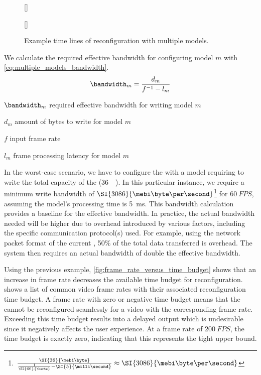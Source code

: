 \begin{figure}[hbtp]
    \centering
    [\textwidth]{
        
    }
    [\textwidth]{
        
    }
    \caption{
        Example time lines of reconfiguration with multiple models.
    }
    \label{fig:reconfig_time_line_ex}
\end{figure}

We calculate the required effective bandwidth for configuring model $m$ with \cref{eq:multiple_models_bandwidth}.
\begin{equation}
    \bandwidth_m = \frac{d_m}{f^{-1} - l_m}
    \label{eq:multiple_models_bandwidth}
\end{equation}

\begin{eqexpl}[15mm]
    \item{$\bandwidth_m$} required effective bandwidth for writing model $m$
    \item{$d_m$} amount of bytes to write for model $m$
    \item{$f$} input frame rate
    \item{$l_m$} frame processing latency for model $m$
\end{eqexpl}

In the worst-case scenario, we have to configure the \graicore{} with a model requiring to write the total capacity of the \graicore{} (\SI{36}{\mebi\byte}).
In this particular instance, we require a minimum write bandwidth of $\SI{3086}{\mebi\byte\per\second}$\footnote{$\frac{\SI{36}{\mebi\byte}}{\frac{1}{\SI{60}{\hertz}} - \SI{5}{\milli\second}} \approx \SI{3086}{\mebi\byte\per\second}$} for $\SI{60}{FPS}$, assuming the model's processing time is \SI{5}{ms}.
This bandwidth calculation provides a baseline for the effective bandwidth.
In practice, the actual bandwidth needed will be higher due to overhead introduced by various factors, including the specific communication protocol(s) used.
For example, using the network packet format of the current \confignoc{}, 50\% of the total data transferred is overhead.
The system then requires an actual bandwidth of double the effective bandwidth.

Using the previous example, \cref{fig:frame_rate_versus_time_budget} shows that an increase in frame rate decreases the available time budget for reconfiguration.
 shows a list of common video frame rates with their associated reconfiguration time budget.
A frame rate with zero or negative time budget means that the \graicore{} cannot be reconfigured seamlessly for a video with the corresponding frame rate.
Exceeding this time budget results into a delayed output which is undesirable since it negatively affects the user experience.
At a frame rate of $\SI{200}{FPS}$, the time budget is exactly zero, indicating that this represents the tight upper bound.

